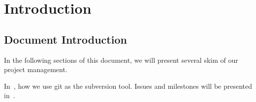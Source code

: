 
\section{Introduction}
\label{sec:intro}
\subsection{Document Introduction}
\label{sec:introduction}
	In the following sections of this document, we will present several skim of our project management.

	In~, how we use git as the subversion tool. Issues and milestones will be presented in~.


